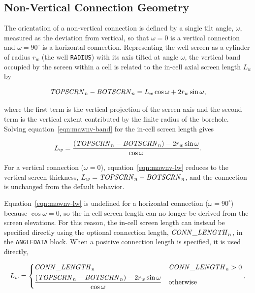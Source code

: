 \subsection{Non-Vertical Connection Geometry}

The orientation of a non-vertical connection is defined by a single tilt angle, $\omega$, measured as the deviation from vertical, so that $\omega = 0$ is a vertical connection and $\omega = 90^{\circ}$ is a horizontal connection. Representing the well screen as a cylinder of radius $r_w$ (the well \texttt{RADIUS}) with its axis tilted at angle $\omega$, the vertical band occupied by the screen within a cell is related to the in-cell axial screen length $L_w$ by

\begin{equation}
	\label{eqn:mawnv-band}
	\mathit{TOPSCRN}_n - \mathit{BOTSCRN}_n = L_w \cos \omega + 2 r_w \sin \omega ,
\end{equation}

\noindent where the first term is the vertical projection of the screen axis and the second term is the vertical extent contributed by the finite radius of the borehole. Solving equation~\ref{eqn:mawnv-band} for the in-cell screen length gives

\begin{equation}
	\label{eqn:mawnv-lw}
	L_w = \frac{\left( \mathit{TOPSCRN}_n - \mathit{BOTSCRN}_n \right) - 2 r_w \sin \omega}{\cos \omega} .
\end{equation}

\noindent For a vertical connection ($\omega = 0$), equation~\ref{eqn:mawnv-lw} reduces to the vertical screen thickness, $L_w = \mathit{TOPSCRN}_n - \mathit{BOTSCRN}_n$, and the connection is unchanged from the default behavior.

Equation~\ref{eqn:mawnv-lw} is undefined for a horizontal connection ($\omega = 90^{\circ}$) because $\cos \omega = 0$, so the in-cell screen length can no longer be derived from the screen elevations. For this reason, the in-cell screen length can instead be specified directly using the optional connection length, $\mathit{CONN\_LENGTH}_n$, in the \texttt{ANGLEDATA} block. When a positive connection length is specified, it is used directly,

\begin{equation}
	\label{eqn:mawnv-lwc}
	L_w = \begin{dcases}
		\mathit{CONN\_LENGTH}_n & \mathit{CONN\_LENGTH}_n > 0 \\
		\frac{\left( \mathit{TOPSCRN}_n - \mathit{BOTSCRN}_n \right) - 2 r_w \sin \omega}{\cos \omega} & \text{otherwise}
	\end{dcases} ,
\end{equation}

